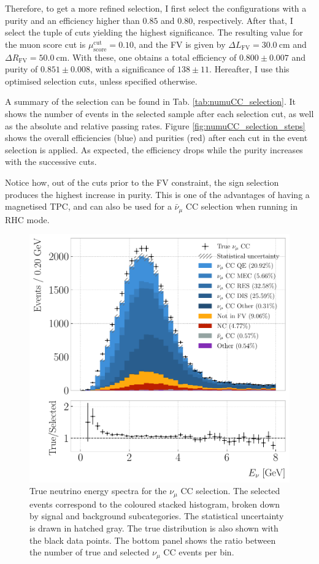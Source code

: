 Therefore, to get a more refined selection, I first select the configurations with a purity and an efficiency higher than $0.85$ and $0.80$, respectively. After that, I select the tuple of cuts yielding the highest significance. The resulting value for the muon score cut is $\mu_{\mathrm{score}}^{\mathrm{cut}} = 0.10$, and the FV is given by $\Delta L_{\mathrm{FV}} = 30.0~\mathrm{cm}$ and $\Delta R_{\mathrm{FV}} = 50.0~\mathrm{cm}$. With these, one obtains a total efficiency of $0.800 \pm 0.007$ and purity of $0.851 \pm 0.008$, with a significance of $138 \pm 11$. Hereafter, I use this optimised selection cuts, unless specified otherwise.

A summary of the selection can be found in Tab. \ref{tab:numuCC_selection}. It shows the number of events in the selected sample after each selection cut, as well as the absolute and relative passing rates. Figure \ref{fig:numuCC_selection_steps} shows the overall efficiencies (blue) and purities (red) after each cut in the event selection is applied. As expected, the efficiency drops while the purity increases with the successive cuts.

Notice how, out of the cuts prior to the FV constraint, the sign selection produces the highest increase in purity. This is one of the advantages of having a magnetised TPC, and can also be used for a $\bar{\nu}_{\mu}$ CC selection when running in RHC mode.

\begin{figure}[t]
	\centering
	\includegraphics[width=.80\linewidth]{Images/GAr_selection/numuCC_selection_true_energy.pdf}
	\caption[True neutrino energy spectra for the $\nu_{\mu}$ CC selection.]{True neutrino energy spectra for the $\nu_{\mu}$ CC selection. The selected events correspond to the coloured stacked histogram, broken down by signal and background subcategories. The statistical uncertainty is drawn in hatched gray. The true distribution is also shown with the black data points. The bottom panel shows the ratio between the number of true and selected $\nu_{\mu}$ CC events per bin.}
	\label{fig:numuCC_selection_true_enu}
\end{figure}

